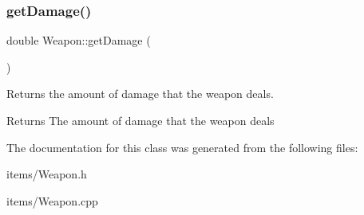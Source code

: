 \subsubsection{\texorpdfstring{getDamage()}{getDamage()}}
{\footnotesize\ttfamily double Weapon\+::get\+Damage (\begin{DoxyParamCaption}{ }\end{DoxyParamCaption})}



Returns the amount of damage that the weapon deals. 

\begin{DoxyReturn}{Returns}
The amount of damage that the weapon deals 
\end{DoxyReturn}


The documentation for this class was generated from the following files\+:\begin{DoxyCompactItemize}
\item 
items/Weapon.\+h\item 
items/Weapon.\+cpp\end{DoxyCompactItemize}
